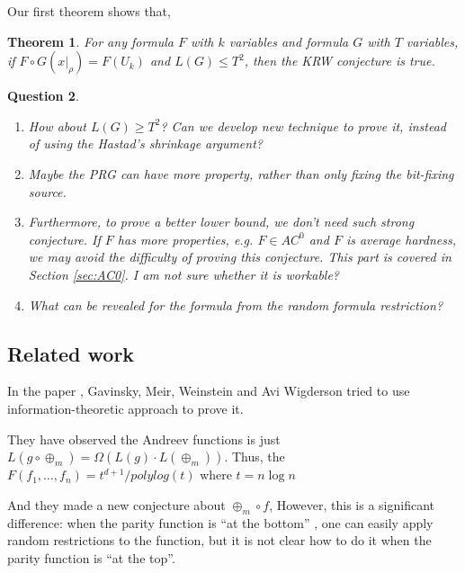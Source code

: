 \documentclass[12pt]{article}
\newtheorem{theorem}{Theorem}[section]
\newtheorem{q}[theorem]{Question}
\renewcommand{\.}{,\ldots,}
\begin{document}
Our first theorem shows that, 
\begin{theorem}
	For any formula $F$ with $k$ variables and  formula $G$ with $T$ variables, if $F\circ G(x|_\rho)=F(U_k)$ and $L(G)\leq T^2$, then the KRW conjecture is true.
\end{theorem}
\begin{q}
	\begin{enumerate}
		\item How about $L(G)\ge T^2$?  Can we develop new technique to prove it, instead of using the Hastad's shrinkage argument?
		\item Maybe the PRG  can have more property, rather than only fixing the bit-fixing source.
		\item Furthermore, to prove a better lower bound, we don't need such strong conjecture. If $F$ has more properties, e.g. $F\in AC^0$ and $F$ is average hardness, we may avoid the difficulty of proving this conjecture. This part is covered in Section \ref{sec:AC0}. I am not sure whether it is  workable? 
		\item What can be revealed for the formula from the random formula restriction?
		\end{enumerate}
		\end{q}
\subsection{Related work}
In the paper \cite{gavinsky2014toward},  Gavinsky, Meir, Weinstein and Avi Wigderson tried to use information-theoretic approach to prove it.  

They have observed the Andreev functions is just 
$L(g \circ \oplus_m) = \Omega( L(g) \cdot L(\oplus_m)).$
Thus, the $F(f_1\.f_n)=t^{d+1}/polylog (t)$ where $t=n\log n$

And they made a new conjecture about $\oplus_m\circ f$, However, this is a significant difference:
when the parity function is “at the bottom” , one can easily apply random restrictions
to the function, but it is not clear how to do it when the parity function is “at the top”.


\end{document}
